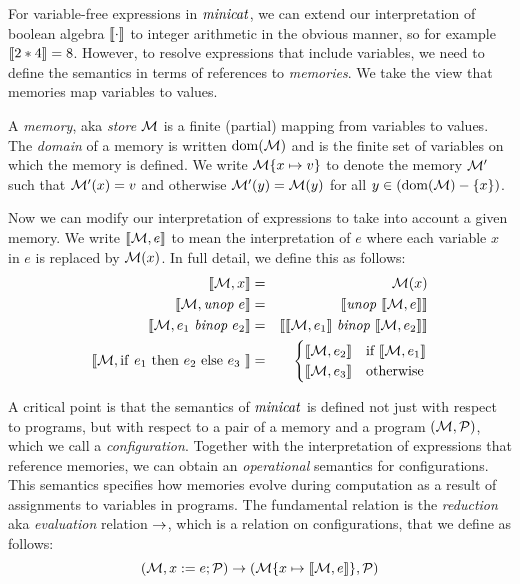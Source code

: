For variable-free expressions in $\mathit{minicat}$,
we can extend our interpretation of
boolean algebra $\llbracket \cdot \rrbracket$ to integer arithmetic in the obvious
manner, so for example $\llbracket 2 * 4 \rrbracket = 8$. However, to resolve
expressions that include variables, we need to define the semantics in
terms of references to \emph{memories}. We take the view that memories
map variables to values.
\begin{definition}[Memories]
A \emph{memory}, aka \emph{store} $\mathcal{M}$ is a finite (partial) mapping from variables to values.
The \emph{domain} of a memory is written $\mathrm{dom}(\mathcal{M})$ and is the finite
set of variables on which the memory is defined. We write $\mathcal{M}\{ x \mapsto v\}$
to denote the memory $\mathcal{M}'$ such that $\mathcal{M}'(x) = v$ and otherwise
$\mathcal{M}'(y) = \mathcal{M}(y)$ for all $y \in (\mathrm{dom}(\mathcal{M}) - \{ x \}) $.
\end{definition}
Now we can modify our interpretation of expressions to take into account a given memory.
We write $\llbracket \mathcal{M}, e \rrbracket$ to mean the interpretation of $e$ where each variable $x$ in $e$
is replaced by $\mathcal{M}(x)$. In full detail, we define this as follows:
\begin{eqnarray*}
\cod{\store, x} &=& \store(x)\\
\cod{\store, \mathit{unop}\ e} &=& \cod{\mathit{unop}\ \cod{\store,e}}\\
\cod{\store, e_1\ \mathit{binop}\ e_2} &=& \cod{\cod{\store,e_1}\ \mathit{binop}\ \cod{\store,e_2}}\\
\cod{\store, \eite{e_1}{e_2}{e_3}} &=&
             \begin{cases}
                \cod{\store,e_2} & \text{if\ } \cod{\store,e_1}\\
                \cod{\store,e_3} & \text{otherwise}
             \end{cases}
\end{eqnarray*}

A critical point is that the semantics of $\mathit{minicat}$ is defined not
just with respect to programs, but with respect to a pair of a memory
and a program $(\mathcal{M}, \mathcal{P})$, which we call
a \emph{configuration}. Together with the interpretation of
expressions that reference memories, we can obtain
an \emph{operational} semantics for configurations. This semantics
specifies how memories evolve during computation as a result of
assignments to variables in programs. The fundamental relation is
the \emph{reduction} aka \emph{evaluation} relation $\rightarrow$,
which is a relation on configurations, that we define as follows:
$$
(\mathcal{M}, x := e;\mathcal{P}) \rightarrow (\mathcal{M}\{x \mapsto \llbracket \mathcal{M},e \rrbracket\}, \mathcal{P})
$$

